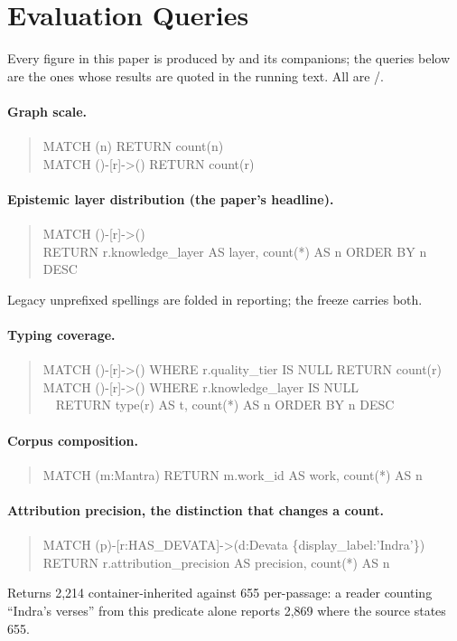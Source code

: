 \section{Evaluation Queries}
\label{sec:appendix-queries}

Every figure in this paper is produced by  and its
companions; the queries below are the ones whose results are quoted in the running
text. All are /.

\paragraph{Graph scale.}
\begin{quote}\small\ttfamily
MATCH (n) RETURN count(n)\\
MATCH ()-[r]->() RETURN count(r)
\end{quote}

\paragraph{Epistemic layer distribution (the paper's headline).}
\begin{quote}\small\ttfamily
MATCH ()-[r]->()\\
RETURN r.knowledge\_layer AS layer, count(*) AS n ORDER BY n DESC
\end{quote}
Legacy unprefixed spellings are folded in reporting; the freeze carries both.

\paragraph{Typing coverage.}
\begin{quote}\small\ttfamily
MATCH ()-[r]->() WHERE r.quality\_tier IS NULL RETURN count(r)\\
MATCH ()-[r]->() WHERE r.knowledge\_layer IS NULL\\
\ \ RETURN type(r) AS t, count(*) AS n ORDER BY n DESC
\end{quote}

\paragraph{Corpus composition.}
\begin{quote}\small\ttfamily
MATCH (m:Mantra) RETURN m.work\_id AS work, count(*) AS n
\end{quote}

\paragraph{Attribution precision, the distinction that changes a count.}
\begin{quote}\small\ttfamily
MATCH (p)-[r:HAS\_DEVATA]->(d:Devata \{display\_label:'Indra'\})\\
RETURN r.attribution\_precision AS precision, count(*) AS n
\end{quote}
Returns 2{,}214 container-inherited against 655 per-passage: a reader counting
``Indra's verses'' from this predicate alone reports 2{,}869 where the source states
655.


